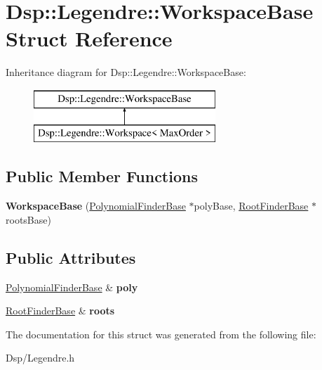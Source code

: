 \hypertarget{structDsp_1_1Legendre_1_1WorkspaceBase}{\section{Dsp\-:\-:Legendre\-:\-:Workspace\-Base Struct Reference}
\label{structDsp_1_1Legendre_1_1WorkspaceBase}
}
Inheritance diagram for Dsp\-:\-:Legendre\-:\-:Workspace\-Base\-:\begin{figure}[H]
\begin{center}
\leavevmode
\includegraphics[height=2.000000cm]{structDsp_1_1Legendre_1_1WorkspaceBase}
\end{center}
\end{figure}
\subsection*{Public Member Functions}
\begin{DoxyCompactItemize}
\item 
\hypertarget{structDsp_1_1Legendre_1_1WorkspaceBase_a338c299a65d02d4557488c4b50cfc89f}{{\bfseries Workspace\-Base} (\hyperlink{classDsp_1_1Legendre_1_1PolynomialFinderBase}{Polynomial\-Finder\-Base} $\ast$poly\-Base, \hyperlink{classDsp_1_1RootFinderBase}{Root\-Finder\-Base} $\ast$roots\-Base)}\label{structDsp_1_1Legendre_1_1WorkspaceBase_a338c299a65d02d4557488c4b50cfc89f}

\end{DoxyCompactItemize}
\subsection*{Public Attributes}
\begin{DoxyCompactItemize}
\item 
\hypertarget{structDsp_1_1Legendre_1_1WorkspaceBase_a092f2a93c9acfea6b9940b76eb300ba5}{\hyperlink{classDsp_1_1Legendre_1_1PolynomialFinderBase}{Polynomial\-Finder\-Base} \& {\bfseries poly}}\label{structDsp_1_1Legendre_1_1WorkspaceBase_a092f2a93c9acfea6b9940b76eb300ba5}

\item 
\hypertarget{structDsp_1_1Legendre_1_1WorkspaceBase_a140234302ffc35302e8bd8e61b09cc13}{\hyperlink{classDsp_1_1RootFinderBase}{Root\-Finder\-Base} \& {\bfseries roots}}\label{structDsp_1_1Legendre_1_1WorkspaceBase_a140234302ffc35302e8bd8e61b09cc13}

\end{DoxyCompactItemize}


The documentation for this struct was generated from the following file\-:\begin{DoxyCompactItemize}
\item 
Dsp/Legendre.\-h\end{DoxyCompactItemize}
